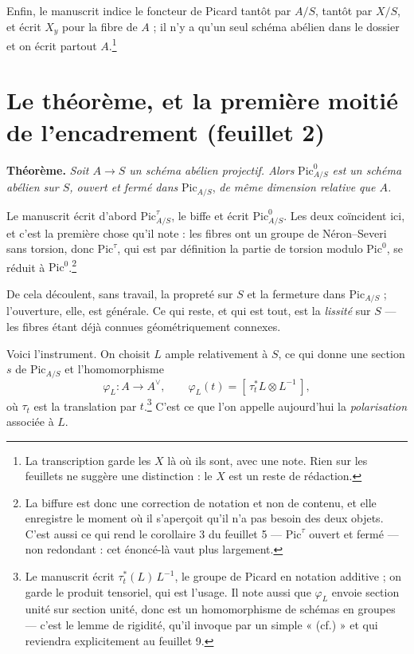 \documentclass[11pt,a4paper]{article}
\begin{document}
Enfin, le manuscrit indice le foncteur de Picard tantôt par $A/S$, tantôt par
$X/S$, et écrit $X_{y}$ pour la fibre de $A$ ; il n'y a qu'un seul schéma
abélien dans le dossier et on écrit partout $A$.\footnote{La transcription
garde les $X$ là où ils sont, avec une note. Rien sur les feuillets ne suggère
une distinction : le $X$ est un reste de rédaction.}

\section*{Le théorème, et la première moitié de l'encadrement (feuillet 2)}

\textbf{Théorème.} \emph{Soit $A \to S$ un schéma abélien projectif. Alors}
$\mathrm{Pic}^{0}_{A/S}$ \emph{est un schéma abélien sur $S$, ouvert et fermé
dans} $\mathrm{Pic}_{A/S}$, \emph{de même dimension relative que $A$.}

Le manuscrit écrit d'abord $\mathrm{Pic}^{\tau}_{A/S}$, le biffe et écrit
$\mathrm{Pic}^{0}_{A/S}$. Les deux coïncident ici, et c'est la première chose
qu'il note : les fibres ont un groupe de Néron--Severi sans torsion, donc
$\mathrm{Pic}^{\tau}$, qui est par définition la partie de torsion modulo
$\mathrm{Pic}^{0}$, se réduit à $\mathrm{Pic}^{0}$.\footnote{La biffure est
donc une correction de notation et non de contenu, et elle enregistre le
moment où il s'aperçoit qu'il n'a pas besoin des deux objets. C'est aussi ce
qui rend le corollaire 3 du feuillet 5 — $\mathrm{Pic}^{\tau}$ ouvert et fermé
— non redondant : cet énoncé-là vaut plus largement.}

De cela découlent, sans travail, la propreté sur $S$ et la fermeture dans
$\mathrm{Pic}_{A/S}$ ; l'ouverture, elle, est générale. Ce qui reste, et qui
est tout, est la \emph{lissité} sur $S$ — les fibres étant déjà connues
géométriquement connexes.

Voici l'instrument. On choisit $L$ ample relativement à $S$, ce qui donne une
section $s$ de $\mathrm{Pic}_{A/S}$ et l'homomorphisme
\[
  \varphi_{L} : A \longrightarrow A^{\vee}, \qquad
  \varphi_{L}(t) = \left[\, \tau_{t}^{*}L \otimes L^{-1} \,\right],
\]
où $\tau_{t}$ est la translation par $t$.\footnote{Le manuscrit écrit
$\tau_{t}^{*}(L)\,L^{-1}$, le groupe de Picard en notation additive ; on garde
le produit tensoriel, qui est l'usage. Il note aussi que $\varphi_{L}$ envoie
section unité sur section unité, donc est un homomorphisme de schémas en
groupes — c'est le lemme de rigidité, qu'il invoque par un simple « (cf.) » et
qui reviendra explicitement au feuillet 9.} C'est ce que l'on appelle
aujourd'hui la \emph{polarisation} associée à $L$.
\end{document}
